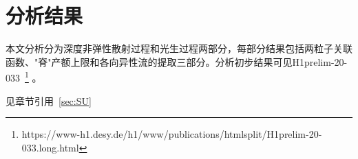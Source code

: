 %
%
%
%

\chapter{分析结果}
本文分析分为深度非弹性散射过程和光生过程两部分，每部分结果包括两粒子关联函数、"脊"产额上限和各向异性流的提取三部分。分析初步结果可见H1prelim-20-033~\footnote{https://www-h1.desy.de/h1/www/publications/htmlsplit/H1prelim-20-033.long.html}
。

见章节引用~\ref{sec:SU}



